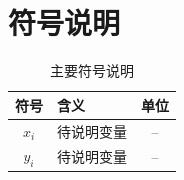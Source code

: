 \section{符号说明}

\begin{table}[!htbp]
  \centering
  \caption{主要符号说明}
  \begin{tabularx}{\textwidth}{cXc}
    \toprule
    符号 & 含义 & 单位 \\
    \midrule
    $x_i$ & 待说明变量 & -- \\
    $y_i$ & 待说明变量 & -- \\
    \bottomrule
  \end{tabularx}
\end{table}
